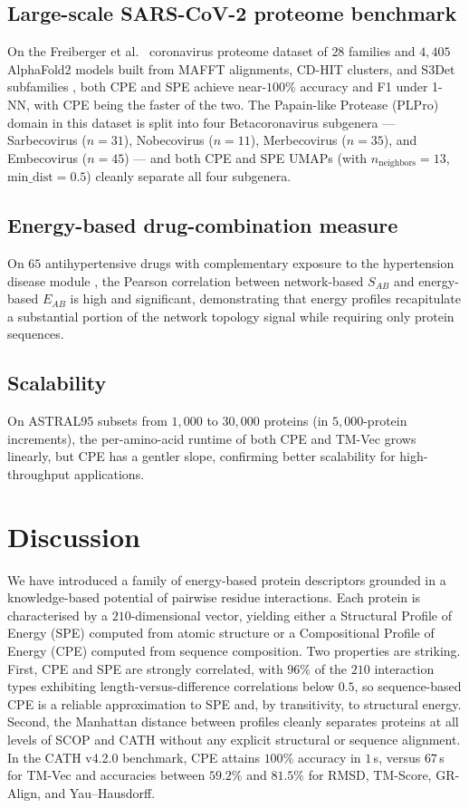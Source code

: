 \documentclass[11pt]{article}
\begin{document}
\subsection{Large-scale SARS-CoV-2 proteome benchmark}
On the Freiberger et al.~\cite{freiberger2023frustration} coronavirus proteome dataset of $28$ families and $4{,}405$ AlphaFold2 models built from MAFFT \cite{katoh2013mafft} alignments, CD-HIT \cite{huang2010cdhit} clusters, and S3Det subfamilies \cite{rausell2010s3det}, both CPE and SPE achieve near-$100\%$ accuracy and F1 under 1-NN, with CPE being the faster of the two. The Papain-like Protease (PLPro) domain in this dataset is split into four Betacoronavirus subgenera --- Sarbecovirus ($n=31$), Nobecovirus ($n=11$), Merbecovirus ($n=35$), and Embecovirus ($n=45$) --- and both CPE and SPE UMAPs (with $n_{\mathrm{neighbors}}=13$, $\mathrm{min\_dist}=0.5$) cleanly separate all four subgenera.

\subsection{Energy-based drug-combination measure}
On $65$ antihypertensive drugs with complementary exposure to the hypertension disease module \cite{cheng2019network}, the Pearson correlation between network-based $S_{AB}$ and energy-based $E_{AB}$ is high and significant, demonstrating that energy profiles recapitulate a substantial portion of the network topology signal while requiring only protein sequences.

\subsection{Scalability}
On ASTRAL95 subsets from $1{,}000$ to $30{,}000$ proteins (in $5{,}000$-protein increments), the per-amino-acid runtime of both CPE and TM-Vec grows linearly, but CPE has a gentler slope, confirming better scalability for high-throughput applications.

\section{Discussion}

We have introduced a family of energy-based protein descriptors grounded in a knowledge-based potential of pairwise residue interactions. Each protein is characterised by a $210$-dimensional vector, yielding either a Structural Profile of Energy (SPE) computed from atomic structure or a Compositional Profile of Energy (CPE) computed from sequence composition. Two properties are striking. First, CPE and SPE are strongly correlated, with $96\%$ of the $210$ interaction types exhibiting length-versus-difference correlations below $0.5$, so sequence-based CPE is a reliable approximation to SPE and, by transitivity, to structural energy. Second, the Manhattan distance between profiles cleanly separates proteins at all levels of SCOP and CATH without any explicit structural or sequence alignment. In the CATH v4.2.0 benchmark, CPE attains $100\%$ accuracy in $1$\,s, versus $67$\,s for TM-Vec and accuracies between $59.2\%$ and $81.5\%$ for RMSD, TM-Score, GR-Align, and Yau--Hausdorff.
\end{document}
